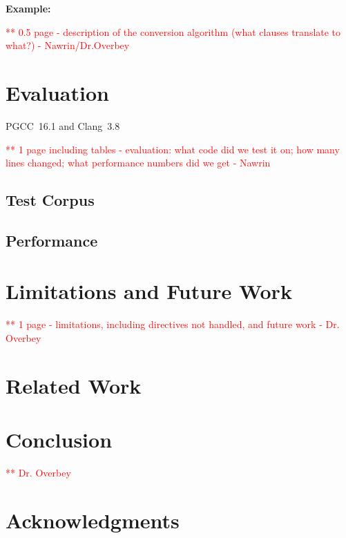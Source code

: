 \documentclass{sig-alternate-05-2015}
\newcommand\todo[1]{\textcolor{red}{** #1}}
\begin{document}
\textbf{Example:}

\todo{0.5 page - description of the conversion algorithm (what clauses translate to what?) - Nawrin/Dr.Overbey} 
\section{Evaluation}

PGCC~16.1 and Clang~3.8

\todo{1 page including tables - evaluation: what code did we test it on; how many lines changed; what performance numbers did we get - Nawrin}
\subsection{Test Corpus}
\subsection{Performance}


\section{Limitations and Future Work}
\todo{1 page - limitations, including directives not handled, and future work - Dr. Overbey}

\section{Related Work}
\section{Conclusion}
\todo{Dr. Overbey}

\section{Acknowledgments}


%

%
%
\end{document}

